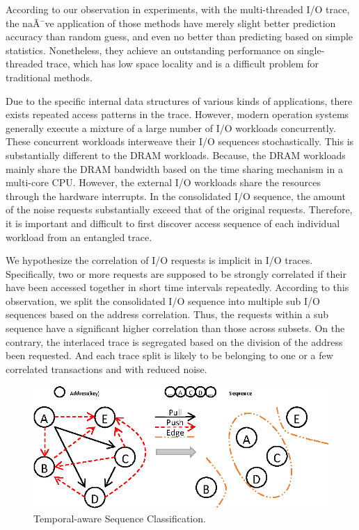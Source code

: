 According to our observation in experiments, with the multi-threaded I/O trace,
the naÃ¯ve application of those methods have merely slight better prediction accuracy than random guess,
and even no better than predicting based on simple statistics.
Nonetheless, they achieve an outstanding performance on single-threaded trace,
which has low space locality and is a difficult problem for traditional methods.

Due to the specific internal data structures of various kinds of applications,
there exists repeated access patterns in the trace.
However, modern operation systems generally execute a mixture of a large number of I/O workloads concurrently.
These concurrent workloads interweave their I/O sequences stochastically.
This is substantially different to the DRAM workloads.
Because, the DRAM workloads mainly share the DRAM bandwidth based on the time sharing mechanism in a multi-core CPU.
However, the external I/O workloads share the resources through the hardware interrupts.
In the consolidated I/O sequence, the amount of the noise requests substantially exceed that of the original requests.
Therefore, it is important and difficult to first discover access sequence of each individual workload from an entangled trace.

We hypothesize the correlation of I/O requests is implicit in I/O traces.
Specifically, two or more requests are supposed to be strongly correlated if their have been accessed together in short time intervals repeatedly.
According to this observation, we split the consolidated I/O sequence into multiple sub I/O sequences based on the address correlation.
Thus, the requests within a sub sequence have a significant higher correlation than those across subsets.
On the contrary, the interlaced trace is segregated based on the division of the address been requested.
And each trace split is likely to be belonging to one or a few correlated transactions and with reduced noise.

\begin{figure}[h]
\centering
\includegraphics[width=0.9\linewidth]{fig/sequence_grouping.eps}
\caption{Temporal-aware Sequence Classification.}
\label{fig:sequence_grouping}
\end{figure}

